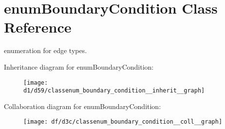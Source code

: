 \hypertarget{classenum_boundary_condition}{}\section{enum\+Boundary\+Condition Class Reference}
\label{classenum_boundary_condition}


enumeration for edge types.  




Inheritance diagram for enum\+Boundary\+Condition\+:
\nopagebreak
\begin{figure}[H]
\begin{center}
\leavevmode
\texttt{[image: d1/d59/classenum\_boundary\_condition\_\_inherit\_\_graph]}
\end{center}
\end{figure}


Collaboration diagram for enum\+Boundary\+Condition\+:
\nopagebreak
\begin{figure}[H]
\begin{center}
\leavevmode
\texttt{[image: df/d3c/classenum\_boundary\_condition\_\_coll\_\_graph]}
\end{center}
\end{figure}
